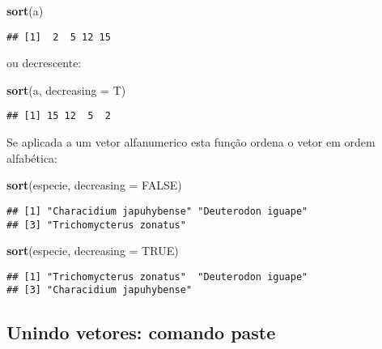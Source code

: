 \documentclass[
]{book}
\newenvironment{Shaded}{\begin{snugshade}}{\end{snugshade}}
\newcommand{\DataTypeTok}[1]{\textcolor[rgb]{0.13,0.29,0.53}{#1}}
\newcommand{\KeywordTok}[1]{\textcolor[rgb]{0.13,0.29,0.53}{\textbf{#1}}}
\newcommand{\NormalTok}[1]{#1}
\newcommand{\OtherTok}[1]{\textcolor[rgb]{0.56,0.35,0.01}{#1}}
\begin{document}
\begin{Shaded}
\begin{Highlighting}[]
\KeywordTok{sort}\NormalTok{(a)}
\end{Highlighting}
\end{Shaded}

\begin{verbatim}
## [1]  2  5 12 15
\end{verbatim}

ou decrescente:

\begin{Shaded}
\begin{Highlighting}[]
\KeywordTok{sort}\NormalTok{(a, }\DataTypeTok{decreasing =}\NormalTok{ T)}
\end{Highlighting}
\end{Shaded}

\begin{verbatim}
## [1] 15 12  5  2
\end{verbatim}

Se aplicada a um vetor alfanumerico esta função ordena o vetor em ordem alfabética:

\begin{Shaded}
\begin{Highlighting}[]
\KeywordTok{sort}\NormalTok{(especie, }\DataTypeTok{decreasing =} \OtherTok{FALSE}\NormalTok{)}
\end{Highlighting}
\end{Shaded}

\begin{verbatim}
## [1] "Characidium japuhybense" "Deuterodon iguape"      
## [3] "Trichomycterus zonatus"
\end{verbatim}

\begin{Shaded}
\begin{Highlighting}[]
\KeywordTok{sort}\NormalTok{(especie, }\DataTypeTok{decreasing =} \OtherTok{TRUE}\NormalTok{)}
\end{Highlighting}
\end{Shaded}

\begin{verbatim}
## [1] "Trichomycterus zonatus"  "Deuterodon iguape"      
## [3] "Characidium japuhybense"
\end{verbatim}

\hypertarget{unindo-vetores-comando-paste}{%
\subsection{Unindo vetores: comando paste}\label{unindo-vetores-comando-paste}}
\end{document}
